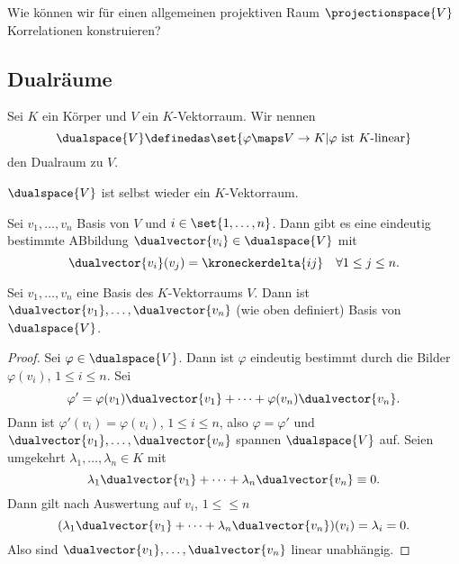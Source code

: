 \begin{frage*}
  Wie können wir für einen allgemeinen projektiven Raum \( \projectionspace{V} \) Korrelationen konstruieren?
\end{frage*}
\subsection{Dualräume}
\begin{definition*}
  Sei \( K \) ein Körper und \( V \) ein \( K \)-Vektorraum. Wir nennen 
  \begin{equation*}
    \dualspace{V}\definedas \set{\varphi\maps V\to K|\varphi \text{ ist \( K \)-linear}}
  \end{equation*}
  den Dualraum zu \( V \).
\end{definition*}
\begin{bemerkung*}
  \( \dualspace{V} \) ist selbst wieder ein \( K \)-Vektorraum.

  Sei \( v_1,\dotsc,v_n \) Basis von \( V \) und \( i\in \set{1,\dotsc, n} \). Dann gibt es eine eindeutig bestimmte ABbildung \( \dualvector{v_i}\in \dualspace{V} \) mit
  \begin{equation*}
    \dualvector{v_i}(v_j)=\kroneckerdelta{ij}\quad \forall 1\leq j\leq n.
  \end{equation*}
\end{bemerkung*}
\begin{lemma}
  Sei \( v_1,\dotsc,v_n \) eine Basis des \( K \)-Vektorraums \( V \). Dann ist \( \dualvector{v_1},\dotsc, \dualvector{v_n} \) (wie oben definiert) Basis von \( \dualspace{V} \).
\end{lemma}
\begin{proof}
  Sei \( \varphi\in \dualspace{V} \). Dann ist \( \varphi \) eindeutig bestimmt durch die Bilder \( \varphi(v_i) \), \( 1\leq i\leq n \). Sei 
  \begin{equation*}
    \varphi'=\varphi(v_1)\dualvector{v_1}+\dotsb+\varphi(v_n)\dualvector{v_n}.
  \end{equation*}
  Dann ist \( \varphi'(v_i)=\varphi(v_i) \), \( 1\leq i\leq n \), also \( \varphi=\varphi' \) und \( \dualvector{v_1},\dotsc,\dualvector{v_n} \) spannen \( \dualspace{V} \) auf. Seien umgekehrt \( \lambda_1,\dotsc,\lambda_n\in K \) mit
  \begin{equation*}
    \lambda_1 \dualvector{v_1}+\dotsb+\lambda_n \dualvector{v_n}\equiv 0.
  \end{equation*}
  Dann gilt nach Auswertung auf \( v_i \), \( 1\leq \leq n \)
  \begin{equation*}
    (\lambda_1 \dualvector{v_1}+\dotsb+\lambda_n \dualvector{v_n})(v_i)=\lambda_i =0.
  \end{equation*}
  Also sind \( \dualvector{v_1},\dotsc,\dualvector{v_n}  \) linear unabhängig.
\end{proof}
